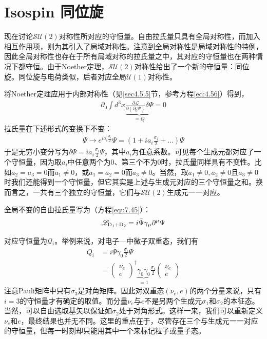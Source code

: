 \section[同位旋]{Isospin \quad 同位旋}\label{sec7.7}
现在讨论$\mathcal{SU}(2)$对称性所对应的守恒量。自由拉氏量只具有全局对称性，而加入相互作用项，则为其引入了局域对称性。注意到全局对称性是局域对称性的特例，因此全局对称性也存在于所有局域对称的拉氏量之中，其对应的守恒量也在两种情况下都守恒。由于Noether定理，$\mathcal{SU}(2)$对称性给出了一个新的守恒量：同位旋。同位旋与电荷类似，后者对应全局$\mathcal{U}(1)$对称性。

将Noether定理应用于内部对称性（见\ref{sec4.5.5}节，参考方程\ref{eq:4.56}）得到，
\begin{align}
\partial_0\int{d^3x\underbrace{\frac{\partial\mathscr{L}}{\partial(\partial_0\Psi)}\delta\Psi}_{=Q}}=0
\label{equ7.131}
\end{align}
拉氏量在下述形式的变换下不变：
\begin{align}
\Psi\rightarrow e^{ia_i\frac{\sigma_i}{2}}\Psi=(1+ia_i\frac{\sigma_i}{2}+\ldots)\Psi
\label{equ7.132}
\end{align}
于是无穷小变分写为$\delta\Psi=ia_i\frac{\sigma_i}{2}  \Psi$，其中$a_i$为任意系数。可见每个生成元都对应了一个守恒量，因为取$a_i$中任意两个为0、第三个不为0时，拉氏量同样具有不变性。比如$a_2=a_3=0$而$a_1\ne0$，或$a_1=a_2=0$而$a_3\ne0$。当然，取$a_1\ne0,a_2\ne0$且$a_3\ne0$时我们还能得到一个守恒量，但它其实是上述与生成元对应的三个守恒量之和。换而言之，一共有三个独立的守恒量，它们与$\mathcal{SU}(2)$生成元一一对应。

全局不变的自由拉氏量写为（方程\ref{equ7.45}）：
\begin{align*}
\mathscr{L}_\text{D\textsubscript{1}+D\textsubscript{2}}=i\bar{\Psi}\gamma_\mu\partial^\mu\Psi
\end{align*}

对应守恒量为$\mathcal{Q}_i$。举例来说，对电子—中微子双重态，我们有
\begin{align}
Q_i&=i\bar{\Psi}\gamma_0\frac{\sigma_i}{2}\Psi\nonumber\\
&=\begin{pmatrix}\nu_e \\ e\end{pmatrix}^\dag\underbrace{\gamma_0\gamma_0}_{=1}\frac{\sigma_i}{2}\begin{pmatrix}\nu_e \\ e\end{pmatrix}
\label{equ7.133}
\end{align}
注意Pauli矩阵中只有$\sigma_3$是对角矩阵。因此对双重态$(\nu_e, e)$的两个分量来说，只有$i=3$的守恒量才有确定的取值。而分量$\nu_e$与$e$不是另两个生成元$\sigma_1$和$\sigma_2$的本征态。当然，可以自由选取基矢以保证如$\sigma_2$处于对角形式。这样一来，我们可以重新定义$\nu_e$和$e$，最终结果也并无不同。这里的重点在于，尽管存在三个与生成元一一对应的守恒量，但每一时刻却只能用其中一个来标记粒子或量子态。

